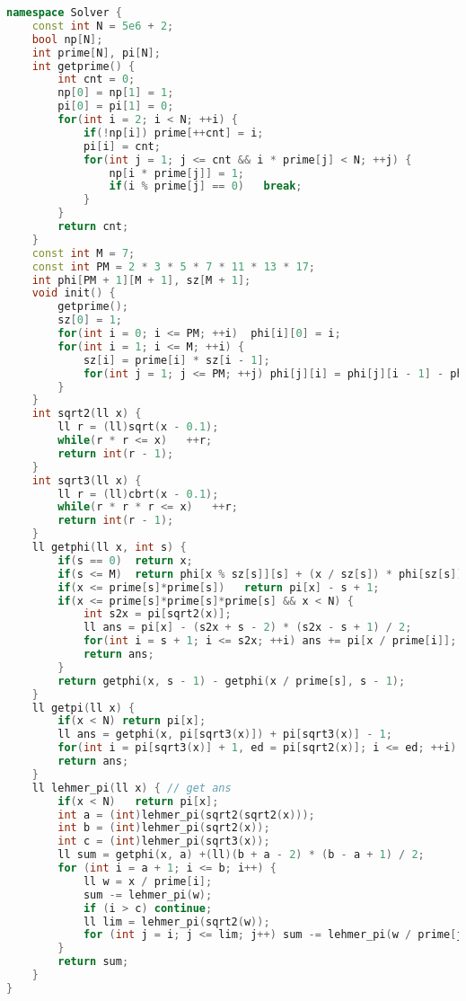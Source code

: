 \begin{lstlisting}[language=C++]
namespace Solver {
    const int N = 5e6 + 2;
    bool np[N];
    int prime[N], pi[N];
    int getprime() {
        int cnt = 0;
        np[0] = np[1] = 1;
        pi[0] = pi[1] = 0;
        for(int i = 2; i < N; ++i) {
            if(!np[i]) prime[++cnt] = i;
            pi[i] = cnt;
            for(int j = 1; j <= cnt && i * prime[j] < N; ++j) {
                np[i * prime[j]] = 1;
                if(i % prime[j] == 0)   break;
            }
        }
        return cnt;
    }
    const int M = 7;
    const int PM = 2 * 3 * 5 * 7 * 11 * 13 * 17;
    int phi[PM + 1][M + 1], sz[M + 1];
    void init() {
        getprime();
        sz[0] = 1;
        for(int i = 0; i <= PM; ++i)  phi[i][0] = i;
        for(int i = 1; i <= M; ++i) {
            sz[i] = prime[i] * sz[i - 1];
            for(int j = 1; j <= PM; ++j) phi[j][i] = phi[j][i - 1] - phi[j / prime[i]][i - 1];
        }
    }
    int sqrt2(ll x) {
        ll r = (ll)sqrt(x - 0.1);
        while(r * r <= x)   ++r;
        return int(r - 1);
    }
    int sqrt3(ll x) {
        ll r = (ll)cbrt(x - 0.1);
        while(r * r * r <= x)   ++r;
        return int(r - 1);
    }
    ll getphi(ll x, int s) {
        if(s == 0)  return x;
        if(s <= M)  return phi[x % sz[s]][s] + (x / sz[s]) * phi[sz[s]][s];
        if(x <= prime[s]*prime[s])   return pi[x] - s + 1;
        if(x <= prime[s]*prime[s]*prime[s] && x < N) {
            int s2x = pi[sqrt2(x)];
            ll ans = pi[x] - (s2x + s - 2) * (s2x - s + 1) / 2;
            for(int i = s + 1; i <= s2x; ++i) ans += pi[x / prime[i]];
            return ans;
        }
        return getphi(x, s - 1) - getphi(x / prime[s], s - 1);
    }
    ll getpi(ll x) {
        if(x < N) return pi[x];
        ll ans = getphi(x, pi[sqrt3(x)]) + pi[sqrt3(x)] - 1;
        for(int i = pi[sqrt3(x)] + 1, ed = pi[sqrt2(x)]; i <= ed; ++i) ans -= getpi(x / prime[i]) - i + 1;
        return ans;
    }
    ll lehmer_pi(ll x) { // get ans
        if(x < N)   return pi[x];
        int a = (int)lehmer_pi(sqrt2(sqrt2(x)));
        int b = (int)lehmer_pi(sqrt2(x));
        int c = (int)lehmer_pi(sqrt3(x));
        ll sum = getphi(x, a) +(ll)(b + a - 2) * (b - a + 1) / 2;
        for (int i = a + 1; i <= b; i++) {
            ll w = x / prime[i];
            sum -= lehmer_pi(w);
            if (i > c) continue;
            ll lim = lehmer_pi(sqrt2(w));
            for (int j = i; j <= lim; j++) sum -= lehmer_pi(w / prime[j]) - (j - 1);
        }
        return sum;
    }
}
\end{lstlisting}


